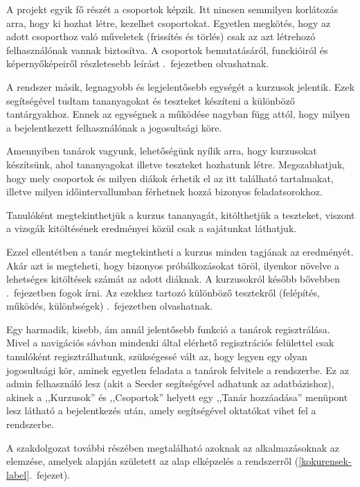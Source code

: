 \documentclass[
]{thesis-ekf}
\theoremstyle{definition}
\theoremstyle{remark}
\begin{document}
        A projekt egyik fő részét a csoportok képzik. Itt nincsen semmilyen korlátozás arra, hogy ki hozhat létre, kezelhet csoportokat. Egyetlen megkötés, hogy az adott csoporthoz való műveletek (frissítés és törlés) csak az azt létrehozó felhasználónak vannak biztosítva. A csoportok bemutatásáról, funckióiról és képernyőképeiről részletesebb leírást \az{\ref{Csoportok-bemutat}}.~fejezetben olvashatnak.

        A rendszer másik, legnagyobb és legjelentősebb egységét a kurzusok jelentik. Ezek segítségével tudtam tananyagokat és teszteket készíteni a különböző tantárgyakhoz. Ennek az egységnek a működése nagyban függ attól, hogy milyen a bejelentkezett felhasználónak a jogosultsági köre. 
        
        Amennyiben tanárok vagyunk, lehetőségünk nyílik arra, hogy kurzusokat készítsünk, ahol tananyagokat illetve teszteket hozhatunk létre. Megszabhatjuk, hogy mely csoportok és milyen diákok érhetik el az itt található tartalmakat, illetve milyen időintervallumban férhetnek hozzá bizonyos feladatsorokhoz. 
        
        Tanulóként megtekinthetjük a kurzus tananyagát, kitölthetjük a teszteket, viszont a vizsgák kitöltésének eredményei közül csak a sajátunkat láthatjuk. 
        
        Ezzel ellentétben a tanár megtekintheti a kurzus minden tagjának az eredményét. Akár azt is megteheti, hogy bizonyos próbálkozásokat töröl, ilyenkor növelve a lehetséges kitöltések számát az adott diáknak. A kurzusokról később bővebben \az{\ref{Kurzusok-bemutat}}.~fejezetben fogok írni. Az ezekhez tartozó különböző tesztekről (felépítés, működés, különbségek) \az{\ref{Tesztek-bemutat}}.~fejezetben olvashatnak.

        Egy harmadik, kisebb, ám annál jelentősebb funkció a tanárok regisztrálása. Mivel a navigációs sávban mindenki által elérhető regisztrációs felülettel csak tanulóként regisztrálhatunk, szükségessé vált az, hogy legyen egy olyan jogosultsági kör, aminek egyetlen feladata a tanárok felvitele a rendszerbe. Ez az admin felhasználó lesz (akit a Seeder segítségével adhatunk az adatbázishoz), akinek a ,,Kurzusok'' és ,,Csoportok'' helyett egy ,,Tanár hozzáadása'' menüpont lesz látható a bejelentkezés után, amely segítségével oktatókat vihet fel a rendszerbe.

        A szakdolgozat további részében megtalálható azoknak az alkalmazásoknak az elemzése, amelyek alapján született az alap elképzelés a rendszerről (\ref{kokurensek-label}.~fejezet). 
        
\end{document}
